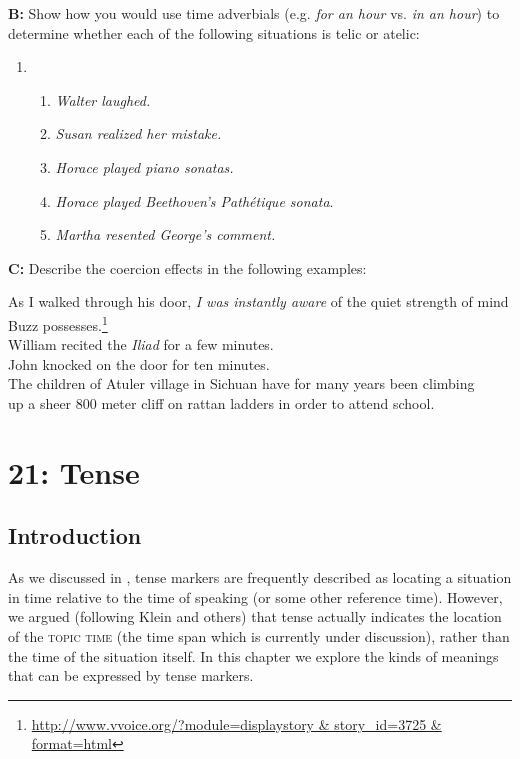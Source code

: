 \textbf{B:} Show how you would use time adverbials (e.g. \textit{for an hour} vs. \textit{in an hour}) to determine whether each of the following situations is telic or atelic:

\begin{enumerate}
\item \begin{enumerate}
\item \itshape
Walter laughed.
\item \itshape
Susan realized her mistake.
\item \itshape
Horace played piano sonatas.
\item \textit{Horace played Beethoven’s Pathétique sonata}.
\item \itshape
Martha resented George’s comment.
\end{enumerate}
\end{enumerate}

\textbf{C:} Describe the coercion effects in the following examples:

\ea
\ea As I walked through his door, \textit{I was instantly aware} of the quiet strength of mind\\
  Buzz possesses.\footnote{\url{http://www.vvoice.org/?module=displaystory & story_id=3725 & format=html}} \\
\ex William recited the \textit{Iliad} for a few minutes.\\
\ex John knocked on the door for ten minutes.\\
\ex The children of Atuler village in Sichuan have for many years been climbing\\
  up a sheer 800 meter cliff on rattan ladders in order to attend school.
\z \z

\chapter{{21}: Tense}

\section{Introduction}\label{sec:} %

As we discussed in , tense markers are frequently described as locating a situation in time relative to the time of speaking (or some other reference time). However, we argued (following Klein and others) that tense actually indicates the location of the \textsc{topic time} (the time span which is currently under discussion), rather than the time of the situation itself. In this chapter we explore the kinds of meanings that can be expressed by tense markers.



